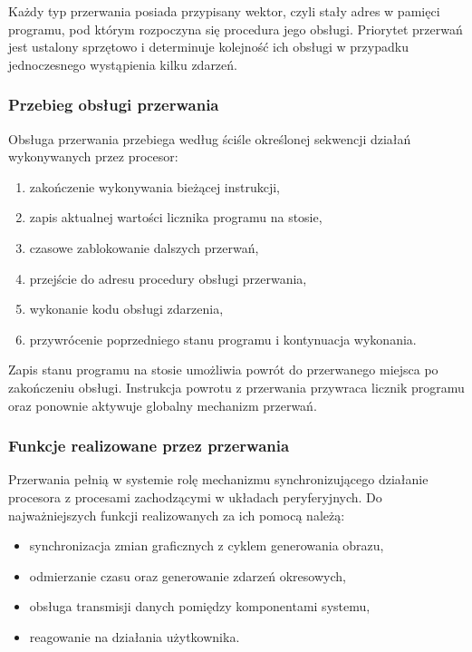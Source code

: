 \documentclass{article}
\begin{document}
Każdy typ przerwania posiada przypisany wektor, czyli stały adres w pamięci programu, pod którym rozpoczyna się procedura jego obsługi. Priorytet przerwań jest ustalony sprzętowo i determinuje kolejność ich obsługi w przypadku jednoczesnego wystąpienia kilku zdarzeń.

\subsubsection{Przebieg obsługi przerwania}

Obsługa przerwania przebiega według ściśle określonej sekwencji działań wykonywanych przez procesor:
\begin{enumerate}
	\item zakończenie wykonywania bieżącej instrukcji,
	\item zapis aktualnej wartości licznika programu na stosie,
	\item czasowe zablokowanie dalszych przerwań,
	\item przejście do adresu procedury obsługi przerwania,
	\item wykonanie kodu obsługi zdarzenia,
	\item przywrócenie poprzedniego stanu programu i kontynuacja wykonania.
\end{enumerate}

Zapis stanu programu na stosie umożliwia powrót do przerwanego miejsca po zakończeniu obsługi. Instrukcja powrotu z przerwania przywraca licznik programu oraz ponownie aktywuje globalny mechanizm przerwań.

\subsubsection{Funkcje realizowane przez przerwania}

Przerwania pełnią w systemie rolę mechanizmu synchronizującego działanie procesora z procesami zachodzącymi w układach peryferyjnych. Do najważniejszych funkcji realizowanych za ich pomocą należą:
\begin{itemize}
	\item synchronizacja zmian graficznych z cyklem generowania obrazu,
	\item odmierzanie czasu oraz generowanie zdarzeń okresowych,
	\item obsługa transmisji danych pomiędzy komponentami systemu,
	\item reagowanie na działania użytkownika.
\end{itemize}
\end{document}
